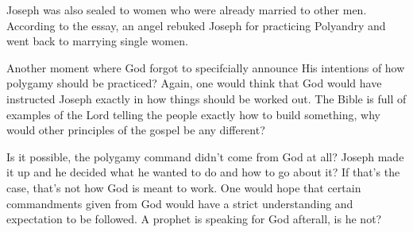 Joseph was also sealed to women who were already married to other men. According to
the essay, an angel rebuked Joseph for practicing Polyandry and went back to marrying
single women.

Another moment where God forgot to specifcially announce His intentions of how
polygamy should be practiced? Again, one would think that God would have instructed
Joseph exactly in how things should be worked out. The Bible is full of examples
of the Lord telling the people exactly how to build something, why would other
principles of the gospel be any different?

Is it possible, the polygamy command didn't come from God at all? Joseph made it up
and he decided what he wanted to do and how to go about it? If that's the case,
that's not how God is meant to work. One would hope that certain commandments given
from God would have a strict understanding and expectation to be followed. A prophet
is speaking for God afterall, is he not?